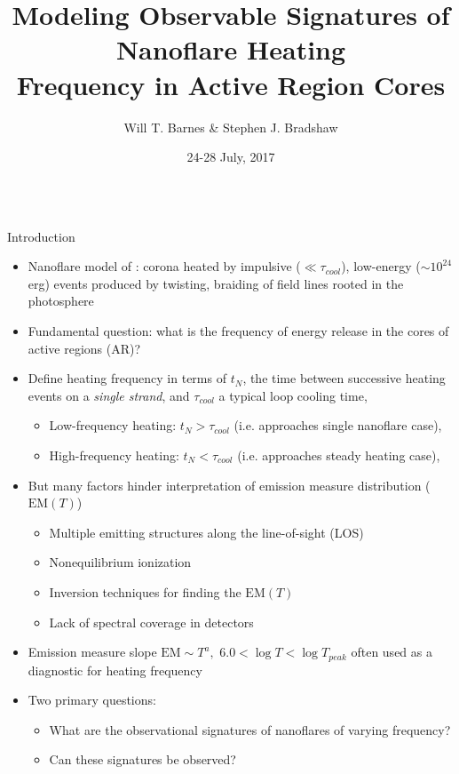 \documentclass[final]{beamer}
\title[Observable Signatures of Nanoflares]{Modeling Observable Signatures of Nanoflare Heating\\Frequency in Active Region Cores}
\author[Barnes \& Bradshaw]{Will T. Barnes \& Stephen J. Bradshaw}
\institute[Rice University]{Department of Physics and Astronomy\\Rice University}
\date{24-28 July, 2017}
\begin{document}
\begin{frame}
  \begin{columns}[T]
  \hfill
  \begin{column}{0.49\linewidth}
    \begin{block}{Introduction}
    \begin{itemize}
      \item Nanoflare model of \citet{parker_nanoflares_1988}: corona heated by impulsive ($\ll\tau_{cool}$), low-energy ($\sim10^{24}$ erg) events produced by twisting, braiding of field lines rooted in the photosphere
      \item Fundamental question: \alert{what is the frequency of energy release in the cores of active regions (AR)?}
      \item Define heating frequency in terms of $t_N$, the time between successive heating events on a \textit{single strand}, and $\tau_{cool}$ a typical loop cooling time,
      \begin{itemize}
        \item Low-frequency heating: $t_N>\tau_{cool}$ (i.e. approaches single nanoflare case), 
        \item High-frequency heating: $t_N<\tau_{cool}$ (i.e. approaches steady heating case), 
      \end{itemize}
      \item But many factors hinder interpretation of emission measure distribution ($\mathrm{EM}(T)$)
      \begin{itemize}
        \item Multiple emitting structures along the line-of-sight (LOS)
        \item Nonequilibrium ionization
        \item Inversion techniques for finding the $\mathrm{EM}(T)$
        \item Lack of spectral coverage in detectors
      \end{itemize}
      \item Emission measure slope $\mathrm{EM}\sim T^a,\,\,6.0<\log{T}<\log{T_{peak}}$ often used as a diagnostic for heating frequency
      \item Two primary questions:
      \begin{itemize}
        \item \alert{What are the observational signatures of nanoflares of varying frequency?}
        \item \alert{Can these signatures be observed?}

\end{itemize}
\end{itemize}
\end{block}
\end{column}
\end{columns}
\end{frame}
\end{document}
